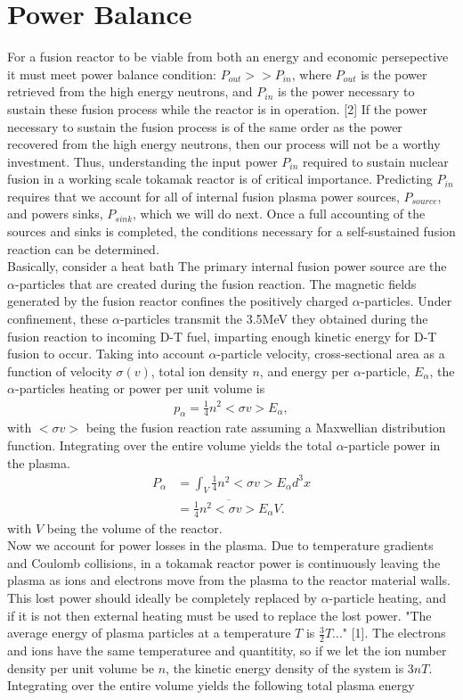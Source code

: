 \documentclass{article}
\begin{document}
\section{Power Balance}
For a fusion reactor to be viable from both an energy and economic persepective it must meet power balance condition: $P_{out} >> P_{in}$, where $P_{out}$ is the power retrieved from the high energy neutrons, and $P_{in}$ is the power necessary to sustain these fusion process while the reactor is in operation. [2] If the power necessary to sustain the fusion process is of the same order as the power recovered from the high energy neutrons, then our process will not be a worthy investment. Thus, understanding the input power $P_{in}$ required to sustain nuclear fusion in a working scale tokamak reactor is of critical importance. Predicting $P_{in}$ requires that we account for all of internal fusion plasma power sources, $P_{source}$, and powers sinks, $P_{sink}$, which we will do next. Once a full accounting of the sources and sinks is completed, the conditions necessary for a self-sustained fusion reaction can be determined. \\
Basically, consider a heat bath
The primary internal fusion power source are the $\alpha$-particles that are created during the fusion reaction. The magnetic fields generated by the fusion reactor confines the positively charged $\alpha$-particles. Under confinement, these $\alpha$-particles transmit the 3.5MeV they obtained during the fusion reaction to incoming D-T fuel, imparting enough kinetic energy for D-T fusion to occur. Taking into account $\alpha$-particle velocity, cross-sectional area as a function of velocity $\sigma(v)$, total ion density $n$, and energy per $\alpha$-particle, $E_{\alpha}$, the $\alpha$-particles heating or power per unit volume is
\begin{align*}
p_{\alpha} = \frac{1}{4} n^2 <\sigma v> E_{\alpha},
\end{align*}
with $<\sigma v>$ being the fusion reaction rate assuming a Maxwellian distribution function. 
Integrating over the entire volume yields the total $\alpha$-particle power in the plasma.
\begin{align*}
P_\alpha &= \int_V \frac{1}{4} n^2 <\sigma v> E_{\alpha} d^3x\\
	     &=  \frac{1}{4}\overline{n^2<\sigma v>}E_{\alpha}V.
\end{align*}
 with $V$ being the volume of the reactor.\\
Now we account for power losses in the plasma. Due to temperature gradients and Coulomb collisions, in a tokamak reactor power is continuously leaving the plasma as ions and electrons move from the plasma to the reactor material walls. This lost power should ideally be completely replaced by $\alpha$-particle heating, and if it is not then external heating must be used to replace the lost power. "The average energy of plasma particles at a temperature $T$ is $\frac{3}{2} T$..." [1]. The electrons and ions have the same temperaturee and quantitity, so if we let the ion number density per unit volume be $n$, the kinetic energy density of the  system is $3nT$. Integrating over the entire volume yields the following total plasma energy 
\end{document}
